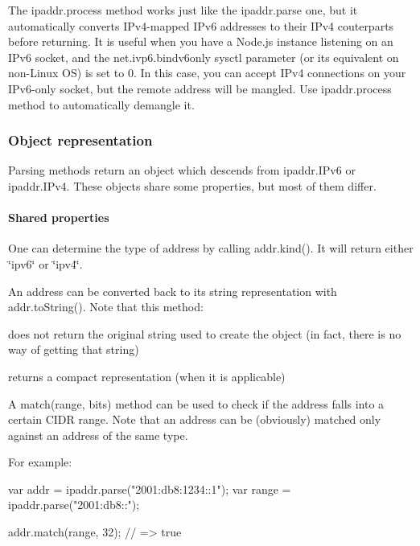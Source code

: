 The {\ttfamily ipaddr.\+process} method works just like the {\ttfamily ipaddr.\+parse} one, but it automatically converts I\+Pv4-\/mapped I\+Pv6 addresses to their I\+Pv4 couterparts before returning. It is useful when you have a Node.\+js instance listening on an I\+Pv6 socket, and the {\ttfamily net.\+ivp6.\+bindv6only} sysctl parameter (or its equivalent on non-\/\+Linux OS) is set to 0. In this case, you can accept I\+Pv4 connections on your I\+Pv6-\/only socket, but the remote address will be mangled. Use {\ttfamily ipaddr.\+process} method to automatically demangle it.

\subsubsection*{Object representation}

Parsing methods return an object which descends from {\ttfamily ipaddr.\+I\+Pv6} or {\ttfamily ipaddr.\+I\+Pv4}. These objects share some properties, but most of them differ.

\paragraph*{Shared properties}

One can determine the type of address by calling {\ttfamily addr.\+kind()}. It will return either {\ttfamily \char`\"{}ipv6\char`\"{}} or {\ttfamily \char`\"{}ipv4\char`\"{}}.

An address can be converted back to its string representation with {\ttfamily addr.\+to\+String()}. Note that this method\+:
\begin{DoxyItemize}
\item does not return the original string used to create the object (in fact, there is no way of getting that string)
\item returns a compact representation (when it is applicable)
\end{DoxyItemize}

A {\ttfamily match(range, bits)} method can be used to check if the address falls into a certain C\+I\+DR range. Note that an address can be (obviously) matched only against an address of the same type.

For example\+:


\begin{DoxyCode}
var addr = ipaddr.parse("2001:db8:1234::1");
var range = ipaddr.parse("2001:db8::");

addr.match(range, 32); // => true
\end{DoxyCode}


